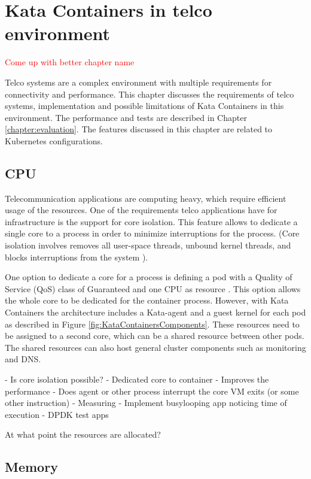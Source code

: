 \chapter{Kata Containers in telco environment}
\label{chapter:implementation}

\textcolor{red}{Come up with better chapter name}

Telco systems are a complex environment with multiple requirements for connectivity and performance. This chapter discusses the requirements of telco systems, implementation and possible limitations of Kata Containers in this environment. The performance and tests are described in Chapter \ref{chapter:evaluation}. The features discussed in this chapter are related to Kubernetes configurations.

\section{CPU}

Telecommunication applications are computing heavy, which require efficient usage of the resources. One of the requirements telco applications have for infrastructure is the support for core isolation. This feature allows to dedicate a single core to a process in order to minimize interruptions for the process. (Core isolation involves removes all user-space threads, unbound kernel threads, and blocks interruptions from the system \cite{CPUisolation}).

One option to dedicate a core for a process is defining a pod with a Quality of Service (QoS) class of Guaranteed and one CPU as resource \cite{QOSKubernetes}. This option allows the whole core to be dedicated for the container process. However, with Kata Containers the architecture includes a Kata-agent and a guest kernel for each pod as described in Figure \ref{fig:KataContainersComponents}. These resources need to be assigned to a second core, which can be a shared resource between other pods. The shared resources can also host general cluster components such as monitoring and DNS.



- Is core isolation possible?
	- Dedicated core to container
		- Improves the performance
	- Does agent or other process interrupt the core VM exits (or some other instruction)
	- Measuring
		- Implement busylooping app noticing time of execution
		- DPDK test apps

At what point the resources are allocated?

\section{Memory}

